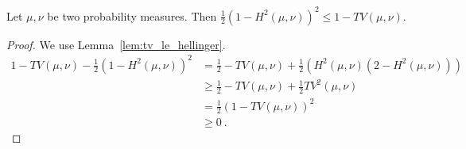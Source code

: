 \begin{corollary}
  \label{cor:one_sub_hellinger_squared_le_one_sub_tv}
  Let $\mu, \nu$ be two probability measures. Then $\frac{1}{2}(1 - H^2(\mu, \nu))^2 \le 1 - TV(\mu, \nu)$.
\end{corollary}

\begin{proof}
We use Lemma~\ref{lem:tv_le_hellinger}.
\begin{align*}
1 - TV(\mu, \nu) - \frac{1}{2}(1 - H^2(\mu, \nu))^2
&= \frac{1}{2} - TV(\mu, \nu) + \frac{1}{2}(H^2(\mu, \nu)(2 - H^2(\mu, \nu)))
\\
&\ge \frac{1}{2} - TV(\mu, \nu) + \frac{1}{2}TV^2(\mu, \nu)
\\
&= \frac{1}{2}(1 - TV(\mu, \nu))^2
\\
&\ge 0
\: .
\end{align*}
\end{proof}
